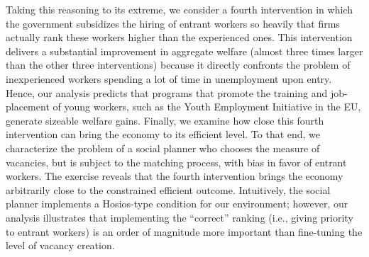 \documentclass[12pt]{article} %
\theoremstyle{definition}
\begin{document}
Taking this reasoning to its extreme, we consider a fourth intervention in which the government subsidizes the hiring of entrant workers so heavily that firms actually rank these workers higher than the experienced ones. This intervention delivers a substantial improvement in aggregate welfare (almost three times larger than the other three interventions) because it directly confronts the problem of inexperienced workers spending a lot of time in unemployment upon entry. Hence, our analysis predicts that programs that promote the training and job-placement of young workers, such as the Youth Employment Initiative in the EU, generate sizeable welfare gains. Finally, we examine how close this fourth intervention can bring the economy to its efficient level. To that end, we characterize the problem of a social planner who chooses the measure of vacancies, but is subject to the \cite{petrongolo2001looking} matching process, with bias {in favor} of entrant workers. The exercise reveals that the fourth intervention brings the economy arbitrarily close to the constrained efficient outcome. Intuitively, the social planner implements a Hosios-type condition for our environment; however, our analysis illustrates that implementing the ``correct'' ranking (i.e., giving priority to entrant workers) is an order of magnitude more important than fine-tuning the level of vacancy creation.



\newpage


\setlength{\bibsep}{0pt}
%

 

\newpage
\end{document}

